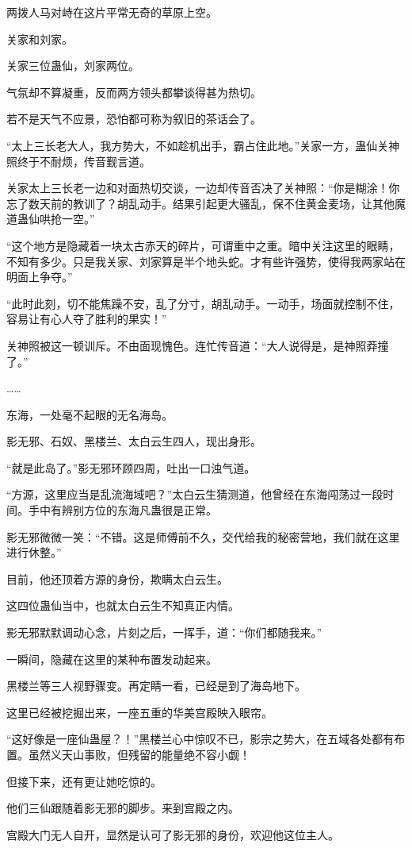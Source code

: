 \begin{this_body}
两拨人马对峙在这片平常无奇的草原上空。

关家和刘家。

关家三位蛊仙，刘家两位。

气氛却不算凝重，反而两方领头都攀谈得甚为热切。

若不是天气不应景，恐怕都可称为叙旧的茶话会了。

“太上三长老大人，我方势大，不如趁机出手，霸占住此地。”关家一方，蛊仙关神照终于不耐烦，传音觐言道。

关家太上三长老一边和对面热切交谈，一边却传音否决了关神照：“你是糊涂！你忘了数天前的教训了？胡乱动手。结果引起更大骚乱，保不住黄金麦场，让其他魔道蛊仙哄抢一空。”

“这个地方是隐藏着一块太古赤天的碎片，可谓重中之重。暗中关注这里的眼睛，不知有多少。只是我关家、刘家算是半个地头蛇。才有些许强势，使得我两家站在明面上争夺。”

“此时此刻，切不能焦躁不安，乱了分寸，胡乱动手。一动手，场面就控制不住，容易让有心人夺了胜利的果实！”

关神照被这一顿训斥。不由面现愧色。连忙传音道：“大人说得是，是神照莽撞了。”

……

东海，一处毫不起眼的无名海岛。

影无邪、石奴、黑楼兰、太白云生四人，现出身形。

“就是此岛了。”影无邪环顾四周，吐出一口浊气道。

“方源，这里应当是乱流海域吧？”太白云生猜测道，他曾经在东海闯荡过一段时间。手中有辨别方位的东海凡蛊很是正常。

影无邪微微一笑：“不错。这是师傅前不久，交代给我的秘密营地，我们就在这里进行休整。”

目前，他还顶着方源的身份，欺瞒太白云生。

这四位蛊仙当中，也就太白云生不知真正内情。

影无邪默默调动心念，片刻之后，一挥手，道：“你们都随我来。”

一瞬间，隐藏在这里的某种布置发动起来。

黑楼兰等三人视野骤变。再定睛一看，已经是到了海岛地下。

这里已经被挖掘出来，一座五重的华美宫殿映入眼帘。

“这好像是一座仙蛊屋？！”黑楼兰心中惊叹不已，影宗之势大，在五域各处都有布置。虽然义天山事败，但残留的能量绝不容小觑！

但接下来，还有更让她吃惊的。

他们三仙跟随着影无邪的脚步。来到宫殿之内。

宫殿大门无人自开，显然是认可了影无邪的身份，欢迎他这位主人。


\end{this_body}
